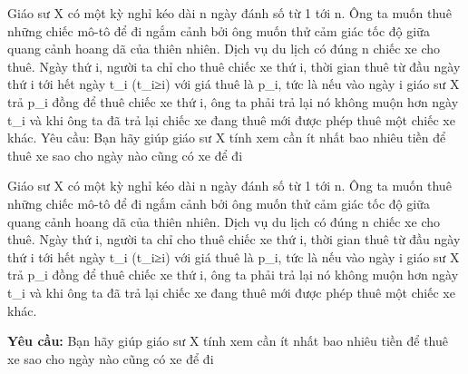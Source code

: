 Giáo sư X có một kỳ nghỉ kéo dài n ngày đánh số từ 1 tới n. Ông ta muốn thuê những chiếc mô-tô để đi ngắm cảnh bởi ông muốn thử cảm giác tốc độ giữa quang cảnh hoang dã của thiên nhiên. Dịch vụ du lịch có đúng n chiếc xe cho thuê. Ngày thứ i, người ta chỉ cho thuê chiếc xe thứ i, thời gian thuê từ đầu ngày thứ i tới hết ngày t\_i (t\_i≥i) với giá thuê là p\_i, tức là nếu vào ngày i giáo sư X trả p\_i đồng để thuê chiếc xe thứ i, ông ta phải trả lại nó không muộn hơn ngày t\_i và khi ông ta đã trả lại chiếc xe đang thuê mới được phép thuê một chiếc xe khác.       Yêu cầu: Bạn hãy giúp giáo sư X tính xem cần ít nhất bao nhiêu tiền để thuê xe sao cho ngày nào cũng có xe để đi    



   Giáo sư X có một kỳ nghỉ kéo dài n ngày đánh số từ 1 tới n. Ông ta muốn thuê những chiếc mô-tô để đi ngắm cảnh bởi ông muốn thử cảm giác tốc độ giữa quang cảnh hoang dã của thiên nhiên. Dịch vụ du lịch có đúng n chiếc xe cho thuê. Ngày thứ i, người ta chỉ cho thuê chiếc xe thứ i, thời gian thuê từ đầu ngày thứ i tới hết ngày t\_i (t\_i≥i) với giá thuê là p\_i, tức là nếu vào ngày i giáo sư X trả p\_i đồng để thuê chiếc xe thứ i, ông ta phải trả lại nó không muộn hơn ngày t\_i và khi ông ta đã trả lại chiếc xe đang thuê mới được phép thuê một chiếc xe khác.  

\textbf{Yêu cầu:}   Bạn hãy giúp giáo sư X tính xem cần ít nhất bao nhiêu tiền để thuê xe sao cho ngày nào cũng có xe để đi
